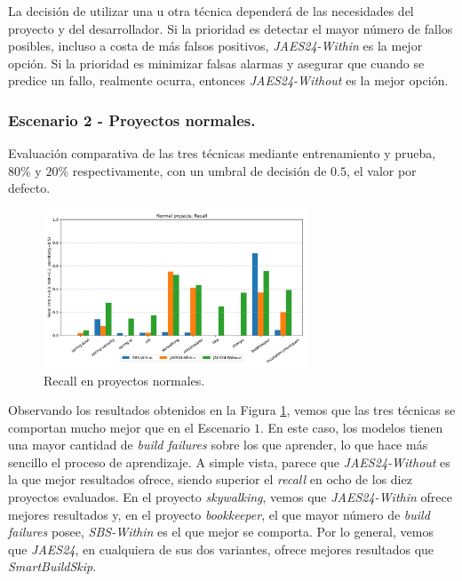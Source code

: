 La decisión de utilizar una u otra técnica dependerá de las necesidades del proyecto y del
desarrollador. Si la prioridad es detectar el mayor número de fallos posibles, incluso a costa de
más falsos positivos, \textit{JAES24-Within} es la mejor opción. Si la prioridad es minimizar
falsas alarmas y asegurar que cuando se predice un fallo, realmente ocurra, entonces
\textit{JAES24-Without} es la mejor opción.\\


\subsubsection{Escenario 2 - Proyectos normales.} Evaluación comparativa de las tres técnicas
mediante entrenamiento y prueba, $80\%$ y $20\%$ respectivamente, con un umbral de decisión
de $0.5$, el valor por defecto.

\begin{figure}[H]
    \centering
    \includegraphics[width=0.7\textwidth]{images/Normal projects: Recall.pdf}
    \caption{Recall en proyectos normales.}
    \label{fig:train_test_recall_normal_projects}
\end{figure}

Observando los resultados obtenidos en la Figura \ref{fig:train_test_recall_normal_projects},
vemos que las tres técnicas se comportan mucho mejor que en el Escenario $1$. En este caso,
los modelos tienen una mayor cantidad de \textit{build failures} sobre los que aprender, lo que
hace más sencillo el proceso de aprendizaje. A simple vista, parece que \textit{JAES24-Without}
es la que mejor resultados ofrece, siendo superior el \textit{recall} en ocho de los diez
proyectos evaluados. En el proyecto \textit{skywalking}, vemos que \textit{JAES24-Within} ofrece
mejores resultados y, en el proyecto \textit{bookkeeper}, el que mayor número de \textit{build
failures} posee, \textit{SBS-Within} es el que mejor se comporta. Por lo general, vemos que
\textit{JAES24}, en cualquiera de sus dos variantes, ofrece mejores resultados que
\textit{SmartBuildSkip}.

